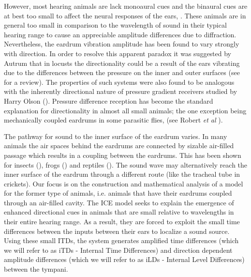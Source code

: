 However, most hearing animals are lack monoaural cues and the binaural
cues are at best too small to affect the neural responses of the ears, \cite{michelsen1}. These animals are in general too small in comparison
to the wavelength of sound in their typical hearing range to cause an appreciable amplitude differences due to diffraction. Nevertheless, 
the eardrum vibration amplitude has been found to vary strongly with direction. In order to resolve this apparent paradox it was
suggested by Autrum \cite{autrumjcomphys} that in locusts the directionality could be a result of the ears vibrating due to the
differences between the pressure on the inner and outer surfaces (see \cite{michelsenlarsen} for a review).  The properties of such systems were also found to be analogous with the inherently directional 
nature of pressure gradient receivers studied by Harry Olson (\cite{olsonmichrophones}). Pressure difference reception has
become the standard explanation for directionality in almost all small animals; the one exception being mechanically coupled
eardrums in some parasitic flies, (see Robert \emph{et al} \cite{roberthoy}).

The pathway for sound to the inner surface of the eardrum varies. In many animals the air spaces behind the eardrums are
connected by sizable air-filled passage which results in a coupling between the eardrums. This has been shown for 
insects (\cite{michelsenbiophysics}), frogs (\cite{jorgensenanurans}) and reptiles (\cite{dalsgaardmanley1}). The sound wave
may alternatively reach the inner surface of the eardrum through a different route (like the tracheal tube in crickets). Our focus
is on the construction and mathematical analysis of a model for the former type of animals, i.e. animals that have their eardrums coupled through an air-filled cavity. 
The ICE model seeks to explain the emergence of enhanced directional cues in animals that are small relative to wavelengths
in their entire hearing range. As a result, they are forced to exploit the small time differences between the inputs between
their ears to localize a sound source. Using these small ITDs, the system generates amplified
 time differences (which we will refer to as iTDs - Internal Time Differences) and direction dependent amplitude differences (which we will
 refer to as iLDs - Internal Level Differences) between the tympani.
 
